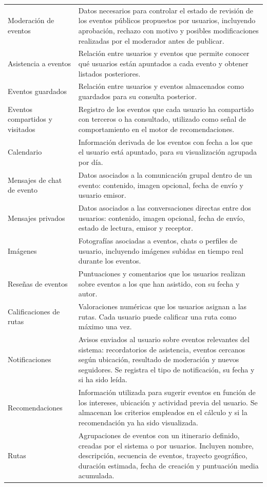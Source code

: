 {\begin{longtable}{@{}>{\raggedright\arraybackslash}p{} >{\raggedright\arraybackslash}p{}@{}}
Moderación de eventos & Datos necesarios para controlar el estado de revisión de los eventos públicos propuestos por usuarios, incluyendo aprobación, rechazo con motivo y posibles modificaciones realizadas por el moderador antes de publicar. \\
Asistencia a eventos & Relación entre usuarios y eventos que permite conocer qué usuarios están apuntados a cada evento y obtener listados posteriores. \\
Eventos guardados & Relación entre usuarios y eventos almacenados como guardados para su consulta posterior. \\
Eventos compartidos y visitados & Registro de los eventos que cada usuario ha compartido con terceros o ha consultado, utilizado como señal de comportamiento en el motor de recomendaciones. \\
Calendario & Información derivada de los eventos con fecha a los que el usuario está apuntado, para su visualización agrupada por día. \\
Mensajes de chat de evento & Datos asociados a la comunicación grupal dentro de un evento: contenido, imagen opcional, fecha de envío y usuario emisor. \\
Mensajes privados & Datos asociados a las conversaciones directas entre dos usuarios: contenido, imagen opcional, fecha de envío, estado de lectura, emisor y receptor. \\
Imágenes & Fotografías asociadas a eventos, chats o perfiles de usuario, incluyendo imágenes subidas en tiempo real durante los eventos. \\
Reseñas de eventos & Puntuaciones y comentarios que los usuarios realizan sobre eventos a los que han asistido, con su fecha y autor. \\
Calificaciones de rutas & Valoraciones numéricas que los usuarios asignan a las rutas. Cada usuario puede calificar una ruta como máximo una vez. \\
Notificaciones & Avisos enviados al usuario sobre eventos relevantes del sistema: recordatorios de asistencia, eventos cercanos según ubicación, resultado de moderación y nuevos seguidores. Se registra el tipo de notificación, su fecha y si ha sido leída. \\
Recomendaciones & Información utilizada para sugerir eventos en función de los intereses, ubicación y actividad previa del usuario. Se almacenan los criterios empleados en el cálculo y si la recomendación ya ha sido visualizada. \\
Rutas & Agrupaciones de eventos con un itinerario definido, creadas por el sistema o por usuarios. Incluyen nombre, descripción, secuencia de eventos, trayecto geográfico, duración estimada, fecha de creación y puntuación media acumulada. \\

\end{longtable}}
